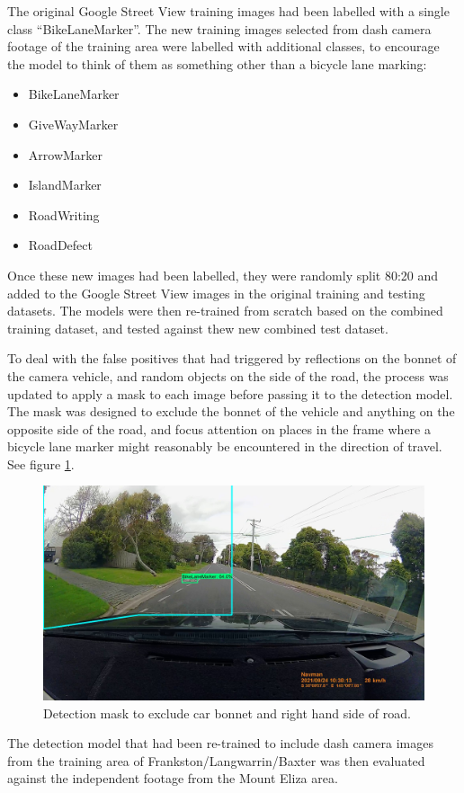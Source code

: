 \documentclass[11pt,twoside]{report}
\begin{document}
The original Google Street View training images had been labelled with a single class ``BikeLaneMarker''.  The new training images selected from dash camera footage of the training area were labelled with additional classes, to encourage the model to think of them as something other than a bicycle lane marking:

\begin{itemize}
\item{BikeLaneMarker}
\item{GiveWayMarker}
\item{ArrowMarker}
\item{IslandMarker}
\item{RoadWriting}
\item{RoadDefect}
\end{itemize}

Once these new images had been labelled, they were randomly split 80:20 and added to the Google Street View images in the original training and testing datasets.  The models were then re-trained from scratch based on the combined training dataset, and tested against thew new combined test dataset.

To deal with the false positives that had triggered by reflections on the bonnet of the camera vehicle, and random objects on the side of the road, the process was updated to apply a mask to each image before passing it to the detection model.  The mask was designed to exclude the bonnet of the vehicle and anything on the opposite side of the road, and focus attention on places in the frame where a bicycle lane marker might reasonably be encountered in the direction of travel.  See figure \ref{fig:006}.

\begin{figure}[h!]
\centering
\includegraphics[width=0.5\linewidth]{f006_mask.jpg}
\caption{Detection mask to exclude car bonnet and right hand side of road.}
\label{fig:006}
\end{figure}

The detection model that had been re-trained to include dash camera images from the training area of Frankston/Langwarrin/Baxter was then evaluated against the independent footage from the Mount Eliza area.
\end{document}
